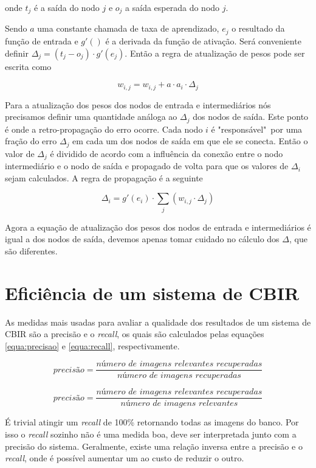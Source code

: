onde $t_j$ é a saída do nodo $j$ e $o_j$ a saída esperada do nodo $j$.

Sendo $a$ uma constante chamada de taxa de aprendizado, $e_j$ o resultado da função de entrada e $g'()$ é a derivada da função de ativação. Será conveniente definir $\Delta_j = (t_j - o_j) \cdot g'(e_j)$. Então a regra de atualização de pesos pode ser escrita como

\begin{equation}
	w_{i,j} = w_{i,j} + a \cdot a_i \cdot \Delta_j
\end{equation}

Para a atualização dos pesos dos nodos de entrada e intermediários nós precisamos definir uma quantidade análoga ao $\Delta_j$ dos nodos de saída. Este ponto é onde a retro-propagação do erro ocorre. Cada nodo $i$ é "responsável"~por uma fração do erro $\Delta_j$ em cada um dos nodos de saída em que ele se conecta. Então o valor de $\Delta_j$ é dividido de acordo com a influência da conexão entre o nodo intermediário e o nodo de saída e propagado de volta para que os valores de $\Delta_i$ sejam calculados. A regra de propagação é a seguinte

\begin{equation}
	\Delta_i = g'(e_i) \cdot \sum_j \left(w_{i,j} \cdot \Delta_j\right)
\end{equation}

Agora a equação de atualização dos pesos dos nodos de entrada e intermediários é igual a dos nodos de saída, devemos apenas tomar cuidado no cálculo dos $\Delta$, que são diferentes.

\section{Eficiência de um sistema de CBIR}

As medidas mais usadas para avaliar a qualidade dos resultados de um sistema de CBIR são a precisão e o \textit{recall}, os quais são calculados pelas equações \ref{equa:precisao} e \ref{equa:recall}, respectivamente.

\begin{equation}
	\textit{precisão} = \frac{\textit{número de imagens relevantes recuperadas}}{\textit{número de imagens recuperadas}}
	\label{equa:precisao}
\end{equation}

\begin{equation}
	\textit{precisão} = \frac{\textit{número de imagens relevantes recuperadas}}{\textit{número de imagens relevantes}}
	\label{equa:recall}
\end{equation}

É trivial atingir um \textit{recall} de 100\% retornando todas as imagens do banco. Por isso o \textit{recall} sozinho não é uma medida boa, deve ser interpretada junto com a precisão do sistema. Geralmente, existe uma relação inversa entre a precisão e o \textit{recall}, onde é possível aumentar um ao custo de reduzir o outro.
